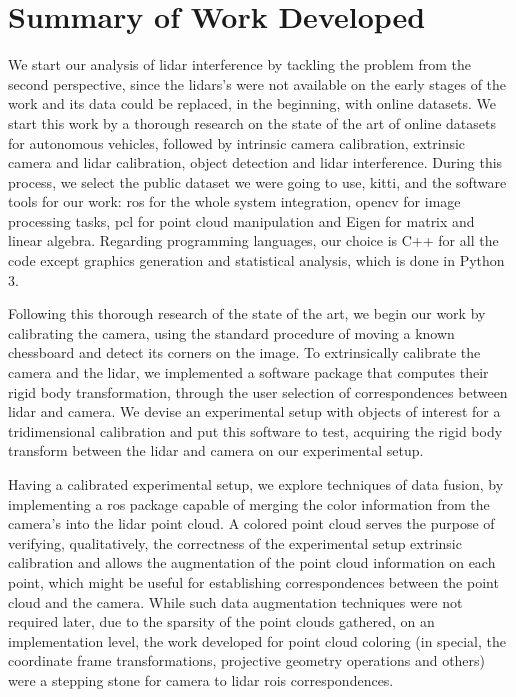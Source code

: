 \section{Summary of Work Developed}
We start our analysis of \ac{lidar} interference by tackling the problem from the second perspective, since the \acp{lidar}'s were not available on the early stages of the work and its data could be replaced, in the beginning, with online datasets. We start this work by a thorough research on the state of the art of online datasets for autonomous vehicles, followed by intrinsic camera calibration, extrinsic camera and \ac{lidar} calibration, object detection and \ac{lidar} interference. During this process, we select the public dataset we were going to use, \ac{kitti}, and the software tools for our work: \ac{ros} for the whole system integration, \ac{opencv} for image processing tasks, \ac{pcl} for point cloud manipulation and Eigen for matrix and linear algebra. Regarding programming languages, our choice is C++ for all the code except graphics generation and statistical analysis, which is done in Python 3. 

Following this thorough research of the state of the art, we begin our work by calibrating the camera, using the standard procedure of moving a known chessboard and detect its corners on the image. To extrinsically calibrate the camera and the \ac{lidar}, we implemented a software package that computes their rigid body transformation, through the user selection of  correspondences between \ac{lidar} and camera. We devise an experimental setup with objects of interest for a tridimensional calibration and put this software to test, acquiring the rigid body transform between the \ac{lidar} and camera on our experimental setup.

Having a calibrated experimental setup, we explore techniques of data fusion, by implementing a \ac{ros} package capable of merging the color information from the camera's into the \ac{lidar} point cloud. A colored point cloud serves the purpose of verifying, qualitatively, the correctness of the experimental setup extrinsic calibration and allows the augmentation of the point cloud information on each point, which might be useful for establishing correspondences between the point cloud and the camera. While such data augmentation techniques were not required later, due to the sparsity of the point clouds gathered, on an implementation level, the work developed for point cloud coloring (in special, the coordinate frame transformations, projective geometry operations and others) were a stepping stone for camera to \ac{lidar} \acfp{roi} correspondences.

